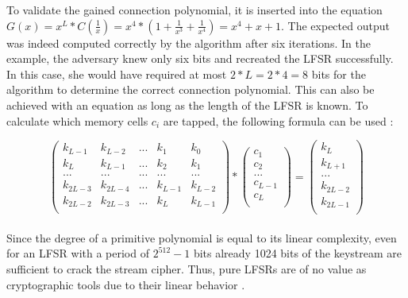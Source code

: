 To validate the gained connection polynomial, it is inserted into the equation $G(x) = x^L * C(\frac{1}{x}) = x^4 * (1 + \frac{1}{x^3} + \frac{1}{x^4}) = x^4 + x + 1$. The expected output was indeed computed correctly by the algorithm after six iterations. In the example, the adversary knew only six bits and recreated the LFSR successfully. In this case, she would have required at most $2*L=2*4=8$ bits for the algorithm to determine the correct connection polynomial. This can also be achieved with an equation as long as the length of the LFSR is known. To calculate which memory cells $c_i$ are tapped, the following formula can be used \cite[p. 232]{Smart.2016}:

\[
	\begin{pmatrix}
		k_{L-1} & k_{L-2} & ... & k_1 & k_0 \\
		k_L & k_{L-1} & ... & k_2 & k_1 \\
		... & ... & ... & ... & ... \\
		k_{2L-3} & k_{2L-4} & ... & k_{L-1} & k_{L-2} \\
		k_{2L-2} & k_{2L-3} & ... & k_L & k_{L-1} \\
	\end{pmatrix} *
	\begin{pmatrix}
		c_1 \\
		c_2 \\
		... \\
		c_{L-1} \\
		c_{L} \\
	\end{pmatrix} =
	\begin{pmatrix}
		k_{L} \\
		k_{L+1} \\
		... \\
		k_{2L-2} \\
		k_{2L-1} \\
	\end{pmatrix}
\]\\

Since the degree of a primitive polynomial is equal to its linear complexity, even for an LFSR with a period of $2^{512}-1$ bits already 1024 bits of the keystream are sufficient to crack the stream cipher. Thus, pure LFSRs are of no value as cryptographic tools due to their linear behavior \cite[p. 231]{Smart.2016}.
